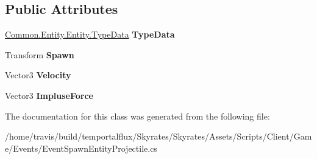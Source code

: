 \subsection*{Public Attributes}
\begin{DoxyCompactItemize}
\item 
\hypertarget{class_skyrates_1_1_client_1_1_game_1_1_event_1_1_event_spawn_entity_projectile_a016797f925bc681a837055b23ee308f2}{\hyperlink{class_skyrates_1_1_common_1_1_entity_1_1_entity_1_1_type_data}{Common.\-Entity.\-Entity.\-Type\-Data} {\bfseries Type\-Data}}\label{class_skyrates_1_1_client_1_1_game_1_1_event_1_1_event_spawn_entity_projectile_a016797f925bc681a837055b23ee308f2}

\item 
\hypertarget{class_skyrates_1_1_client_1_1_game_1_1_event_1_1_event_spawn_entity_projectile_a9e08d311140edf6156e30bcb65c3d257}{Transform {\bfseries Spawn}}\label{class_skyrates_1_1_client_1_1_game_1_1_event_1_1_event_spawn_entity_projectile_a9e08d311140edf6156e30bcb65c3d257}

\item 
\hypertarget{class_skyrates_1_1_client_1_1_game_1_1_event_1_1_event_spawn_entity_projectile_a585b4f98f506b65fca022f40d8187c1e}{Vector3 {\bfseries Velocity}}\label{class_skyrates_1_1_client_1_1_game_1_1_event_1_1_event_spawn_entity_projectile_a585b4f98f506b65fca022f40d8187c1e}

\item 
\hypertarget{class_skyrates_1_1_client_1_1_game_1_1_event_1_1_event_spawn_entity_projectile_ac826f11ddba313002aee37d494f72cf4}{Vector3 {\bfseries Impluse\-Force}}\label{class_skyrates_1_1_client_1_1_game_1_1_event_1_1_event_spawn_entity_projectile_ac826f11ddba313002aee37d494f72cf4}

\end{DoxyCompactItemize}


The documentation for this class was generated from the following file\-:\begin{DoxyCompactItemize}
\item 
/home/travis/build/temportalflux/\-Skyrates/\-Skyrates/\-Assets/\-Scripts/\-Client/\-Game/\-Events/Event\-Spawn\-Entity\-Projectile.\-cs\end{DoxyCompactItemize}
